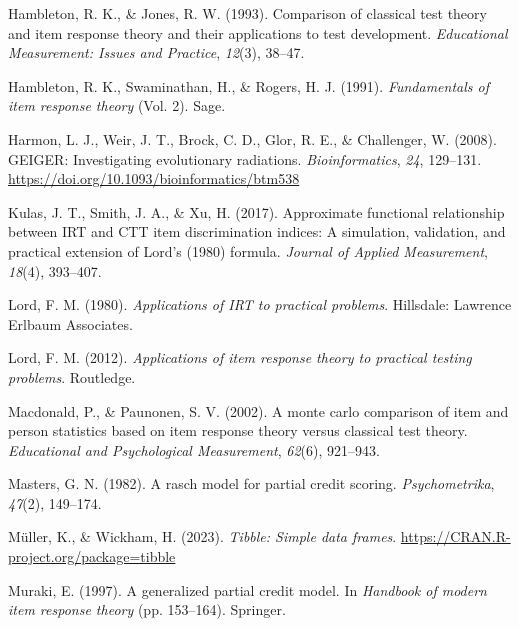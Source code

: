 \documentclass[
  jou]{apa6}
\newlength{\cslhangindent}
\newlength{\cslentryspacingunit} %
\newenvironment{CSLReferences}[2] %
 {%
  \setlength{\parindent}{0pt}
  \ifodd #1
  \let\oldpar\par
  \def\par{\hangindent=\cslhangindent\oldpar}
  \fi
  \setlength{\parskip}{#2\cslentryspacingunit}
 }%
 {}
\begin{document}
\begin{CSLReferences}{1}{0}
\leavevmode{}%
Hambleton, R. K., \& Jones, R. W. (1993). Comparison of classical test theory and item response theory and their applications to test development. \emph{Educational Measurement: Issues and Practice}, \emph{12}(3), 38--47.

\leavevmode{}%
Hambleton, R. K., Swaminathan, H., \& Rogers, H. J. (1991). \emph{Fundamentals of item response theory} (Vol. 2). Sage.

\leavevmode{}%
Harmon, L. J., Weir, J. T., Brock, C. D., Glor, R. E., \& Challenger, W. (2008). GEIGER: Investigating evolutionary radiations. \emph{Bioinformatics}, \emph{24}, 129--131. \url{https://doi.org/10.1093/bioinformatics/btm538}

\leavevmode{}%
Kulas, J. T., Smith, J. A., \& Xu, H. (2017). Approximate functional relationship between IRT and CTT item discrimination indices: A simulation, validation, and practical extension of {Lord's} (1980) formula. \emph{Journal of Applied Measurement}, \emph{18}(4), 393--407.

\leavevmode{}%
Lord, F. M. (1980). \emph{Applications of IRT to practical problems}. Hillsdale: Lawrence Erlbaum Associates.

\leavevmode{}%
Lord, F. M. (2012). \emph{Applications of item response theory to practical testing problems}. Routledge.

\leavevmode{}%
Macdonald, P., \& Paunonen, S. V. (2002). A monte carlo comparison of item and person statistics based on item response theory versus classical test theory. \emph{Educational and Psychological Measurement}, \emph{62}(6), 921--943.

\leavevmode{}%
Masters, G. N. (1982). A rasch model for partial credit scoring. \emph{Psychometrika}, \emph{47}(2), 149--174.

\leavevmode{}%
Müller, K., \& Wickham, H. (2023). \emph{Tibble: Simple data frames}. \url{https://CRAN.R-project.org/package=tibble}

\leavevmode{}%
Muraki, E. (1997). A generalized partial credit model. In \emph{Handbook of modern item response theory} (pp. 153--164). Springer.


\end{CSLReferences}
\end{document}
